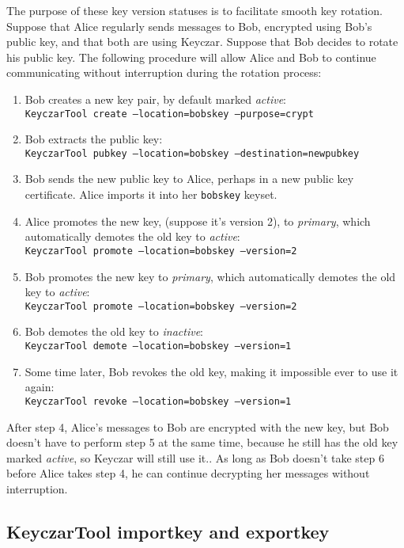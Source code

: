 \documentclass{llncs}
\begin{document}
The purpose of these key version statuses is to facilitate smooth key
rotation.  Suppose that Alice regularly sends messages to Bob,
encrypted using Bob's public key, and that both are using Keyczar.
Suppose that Bob decides to rotate his public key.  The following
procedure will allow Alice and Bob to continue communicating without
interruption during the rotation process:

\begin{enumerate}
\item Bob creates a new key pair, by default marked {\it active}: \\
{\tt KeyczarTool create --location=bobskey --purpose=crypt}
\item Bob extracts the public key: \\
{\tt KeyczarTool pubkey --location=bobskey --destination=newpubkey}
\item Bob sends the new public key to Alice, perhaps in a new public
  key certificate.  Alice imports it into her {\tt bobskey} keyset.
\item Alice promotes the new key, (suppose it's version 2), to {\it
  primary}, which automatically demotes the old key to {\it active}:
  \\
{\tt KeyczarTool promote --location=bobskey --version=2}
\item Bob promotes the new key to {\it primary}, which automatically
  demotes the old key to {\it active}: \\
{\tt KeyczarTool promote --location=bobskey --version=2}
\item Bob demotes the old key to {\it inactive}: \\
{\tt KeyczarTool demote --location=bobskey --version=1}
\item Some time later, Bob revokes the old key, making it impossible
  ever to use it again: \\
{\tt KeyczarTool revoke --location=bobskey --version=1}
\end{enumerate}

After step 4, Alice's messages to Bob are encrypted with the new key,
but Bob doesn't have to perform step 5 at the same time, because he
still has the old key marked {\it active}, so Keyczar will still use
it..  As long as Bob doesn't take step 6 before Alice takes step 4, he
can continue decrypting her messages without interruption.

\subsection{KeyczarTool importkey and exportkey}
\end{document}
